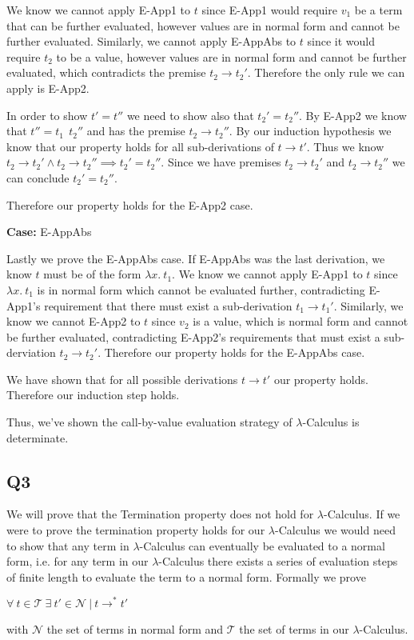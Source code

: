 \documentclass[12pt, fleqn]{article}
\begin{document}
We know we cannot apply E-App1 to $t$ since E-App1 would require $v_1$ be a term that can be further
evaluated, however values are in normal form and cannot be further evaluated.
Similarly, we cannot apply E-AppAbs to $t$ since it would require $t_2$ to be a value, however values are
in normal form and cannot be further evaluated, which contradicts the premise $t_2 \rightarrow t_2'$.
Therefore the only rule we can apply is E-App2.

In order to show $t' = t''$ we need to show also that $t_2' = t_2''$. By E-App2 we know that $t'' = t_1\:\:t_2''$ and
has the premise $t_2 \rightarrow t_2''$. By our induction hypothesis we know that our property holds
for all sub-derivations of $t \rightarrow t'$. Thus we know $t_2 \rightarrow t_2' \land t_2 \rightarrow t_2'' \implies t_2' = t_2''$.
Since we have premises $t_2 \rightarrow t_2'$ and $t_2 \rightarrow t_2''$ we can conclude $t_2' = t_2''$.

Therefore our property holds for the E-App2 case.

\medskip
\textbf{Case:} E-AppAbs

Lastly we prove the E-AppAbs case. If E-AppAbs was the last derivation, we know $t$ must be of the
form $\lambda x.\:t_1$. We know we cannot apply E-App1 to $t$ since $\lambda x.\:t_1$ is in normal form
which cannot be evaluated further, contradicting E-App1's requirement that there must exist a sub-derivation
$t_1 \rightarrow t_1'$. Similarly, we know we cannot E-App2 to $t$ since $v_2$ is a value, which is normal form
and cannot be further evaluated, contradicting E-App2's requirements that must exist a sub-derviation $t_2 \rightarrow
t_2'$.
Therefore our property holds for the E-AppAbs case.

\medskip
We have shown that for all possible derivations $t \rightarrow t'$ our property holds. Therefore our
induction step holds.

\medskip
Thus, we've shown the call-by-value evaluation strategy of $\lambda$-Calculus is determinate.

\subsection{Q3}

We will prove that the Termination property does not hold for $\lambda$-Calculus. If we were to prove the termination
property holds for our $\lambda$-Calculus we would need to show that any term in $\lambda$-Calculus can
eventually be evaluated to a normal form, i.e. for any term in our $\lambda$-Calculus
there exists a series of evaluation steps of finite length to evaluate the term to a normal form. Formally we prove
\begin{center}
    $\forall\:t \in \mathcal{T}\:\exists\:t' \in \mathcal{N}~|~t \rightarrow^* t'$
\end{center}
with  $\mathcal{N}$ the set of terms in normal form and $\mathcal{T}$ the set of terms in our $\lambda$-Calculus.
\end{document}
